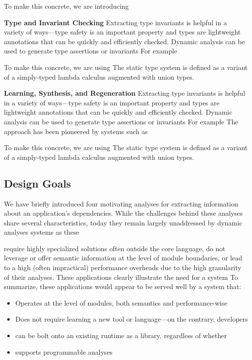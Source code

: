 \documentclass[letterpaper,twocolumn,10pt]{article}
\newcommand{\heading}[1]{\vspace{2pt}\noindent\textbf{#1}\enspace}
\begin{document}
To make this concrete, we are introducing

\heading{Type and Invariant Checking}
Extracting type invariants is helpful in a variety of ways---type safety is an important property and types are lightweight annotations that can be quickly and efficiently checked.
Dynamic analysis can be used to generate type assertions or invariants
For example

To make this concrete, we are using
The static type system is defined as a variant of a simply-typed lambda calculus augmented with union types.

\heading{Learning, Synthesis, and Regeneration}
Extracting type invariants is helpful in a variety of ways---type safety is an important property and types are lightweight annotations that can be quickly and efficiently checked.
Dynamic analysis can be used to generate type assertions or invariants
For example
The approach has been pioneered by systems such as 

To make this concrete, we are using
The static type system is defined as a variant of a simply-typed lambda calculus augmented with union types.


\subsection{Design Goals}

We have briefly introduced four motivating analyses for extracting information about an application's dependencies.
While the challenges behind these analyses share several characteristics, today they remain largely unaddressed by dynamic analyses systems as these 

require highly specialized solutions often outside the core language,
do not leverage or offer semantic information at the level of module boundaries,
or lead to a high (often impractical) performance overheads due to the high granularity of their analyses.
These applications clearly illustrate the need for a system 
To summarize, these applications would appear to be served well by a system that:
\begin{itemize}
  \item Operates at the level of modules, both semantics and performance-wise
  \item Does not require learning a new tool or language---on the contrary,
    developers
  \item can be bolt onto an existing runtime as a library, regardless of whether 
  \item supports programmable analyses
\end{itemize}
\end{document}

